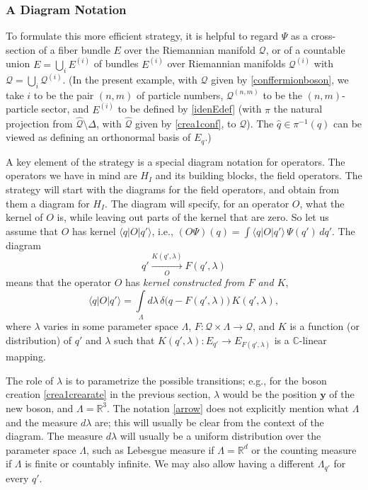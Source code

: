 \documentclass[12pt]{article}
\newcommand{\CCC}{\mathbb{C}} %
\newcommand{\RRR}{\mathbb{R}} %
\newcommand{\1}{\mathbf{1}} %
\renewcommand{\sp}[2]{\langle #1 | #2 \rangle} %
\newcommand{\conf}{\mathcal{Q}} %
\newcommand{\covering}{\pi} %
\newcommand{\vy}{{\boldsymbol y}}
\newcommand{\inter}{{I}} %
\begin{document}
\subsubsection{A Diagram Notation}

To formulate this more efficient strategy, it is helpful to regard 
$\Psi$
as a cross-section of a fiber bundle $E$ over the Riemannian manifold
$\conf$, or of a countable union $E = \bigcup_i E^{(i)}$ of bundles
$E^{(i)}$ over Riemannian manifolds $\conf^{(i)}$ with $\conf = 
\bigcup_i
\conf^{(i)}$. (In the present example, with $\conf$ given by
\eqref{conffermionboson},  we take $i$ to be the pair $(n,m)$ of 
particle
numbers, $\conf^{(n,m)}$ to be the $(n,m)$-particle sector, and 
$E^{(i)}$
to be defined by \eqref{idenEdef} (with $\covering$ the natural 
projection
from $\hat{\conf} \setminus \Delta$, with $\hat{\conf}$ given by
\eqref{crea1conf}, to $\conf$).  The $\hat{q} \in \covering^{-1}(q)$ can
be
viewed as defining an orthonormal basis of $E_q$.)

A key element of the strategy is a special diagram notation for
operators. The operators we have in mind are $H_\inter$ and its
building blocks, the field operators. The strategy will start with the
diagrams for the field operators, and obtain from them a diagram for
$H_\inter$. The diagram will specify, for an operator $O$, what the
kernel of $O$ is, while leaving out parts of the kernel that are zero. 
So
let us assume that $O$ has kernel $\sp{q}{O|q'}$, i.e., $(O\Psi)(q) =
\int \sp{q}{O|q'} \, \Psi(q') \, dq'$. The diagram
\begin{equation}\label{arrow}
   q' \xrightarrow[O]{K(q',\lambda)} F(q',\lambda)
\end{equation}
means that the operator $O$ has \emph{kernel constructed from $F$ and
$K$},
\begin{equation}\label{kernelarrow}
   \sp{q}{O|q'} = \int\limits_{\Lambda} d\lambda \, \delta\big(q-
   F(q',\lambda)\big) \, K(q',\lambda),
\end{equation}
where $\lambda$ varies in some parameter space $\Lambda$, $F: \conf
\times \Lambda \to \conf$, and $K$ is a function (or distribution) of
$q'$ and $\lambda$ such that
   $K(q',\lambda) : E_{q'} \to E_{F(q',\lambda)}$
is a $\CCC$-linear mapping.

The role of $\lambda$ is to parametrize the possible transitions;
e.g., for the boson creation \eqref{crea1crearate} in the previous
section, $\lambda$ would be the position $\vy$ of the new boson, and
$\Lambda = \RRR^3$.  The notation \eqref{arrow} does not explicitly
mention what $\Lambda$ and the measure $d\lambda$ are; this will
usually be clear from the context of the diagram.  The measure
$d\lambda$ will usually be a uniform distribution over the parameter
space $\Lambda$, such as Lebesgue measure if $\Lambda = \RRR^d$ or the
counting measure if $\Lambda$ is finite or countably infinite. We may
also allow having a different $\Lambda_{q'}$ for every $q'$.
\end{document}
